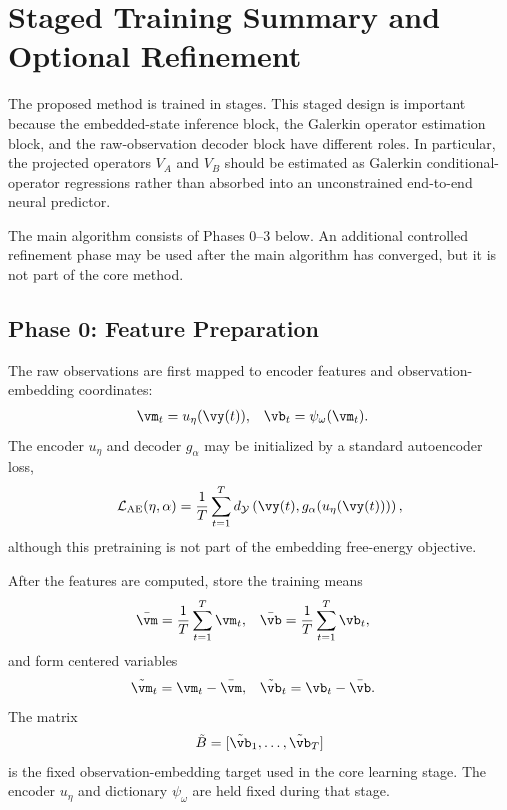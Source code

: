 \documentclass[twoside,11pt]{article}
\begin{document}
\section{Staged Training Summary and Optional Refinement}
\label{sec:staged_training_summary}

The proposed method is trained in stages. This staged design is important
because the embedded-state inference block, the Galerkin operator
estimation block, and the raw-observation decoder block have different
roles. In particular, the projected operators $V_A$ and $V_B$ should be
estimated as Galerkin conditional-operator regressions rather than
absorbed into an unconstrained end-to-end neural predictor.

The main algorithm consists of Phases 0--3 below. An additional
controlled refinement phase may be used after the main algorithm has
converged, but it is not part of the core method.

\subsection{Phase 0: Feature Preparation}

The raw observations are first mapped to encoder features and
observation-embedding coordinates:
\begin{align}
\vm_t
&=
u_\eta(\vy(t)),
&
\vb_t
&=
\psi_\omega(\vm_t).
\label{eq:phase0_features}
\end{align}
The encoder $u_\eta$ and decoder $g_\alpha$ may be initialized by a
standard autoencoder loss,
\begin{align}
\mathcal L_{\mathrm{AE}}(\eta,\alpha)
=
\frac1T
\sum_{t=1}^T
d_{\mathcal Y}
\left(
\vy(t),
g_\alpha(u_\eta(\vy(t)))
\right),
\label{eq:phase0_autoencoder_loss}
\end{align}
although this pretraining is not part of the embedding free-energy
objective.

After the features are computed, store the training means
\begin{align}
\bar{\vm}
&=
\frac1T\sum_{t=1}^T\vm_t,
&
\bar{\vb}
&=
\frac1T\sum_{t=1}^T\vb_t,
\label{eq:phase0_training_means}
\end{align}
and form centered variables
\begin{align}
\tilde{\vm}_t
&=
\vm_t-\bar{\vm},
&
\tilde{\vb}_t
&=
\vb_t-\bar{\vb}.
\label{eq:phase0_centered_features}
\end{align}
The matrix
\begin{align}
\tilde B
=
[\tilde{\vb}_1,\dots,\tilde{\vb}_T]
\label{eq:phase0_centered_B}
\end{align}
is the fixed observation-embedding target used in the core learning
stage. The encoder $u_\eta$ and dictionary $\psi_\omega$ are held fixed
during that stage.
\end{document}
